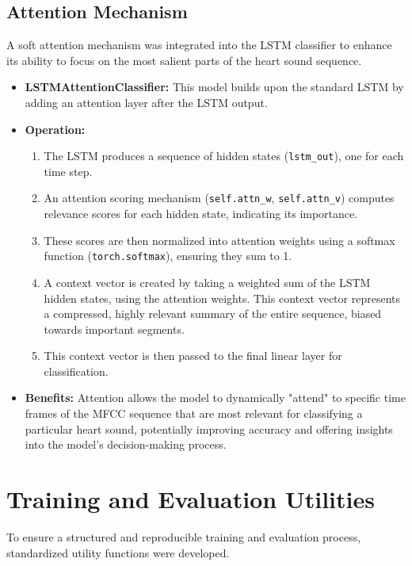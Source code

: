 \documentclass[a4paper]{article}
\begin{document}
\begin{multicols}{2}
\subsection{Attention Mechanism}
A soft attention mechanism was integrated into the LSTM classifier to enhance its ability to focus on the most salient parts of the heart sound sequence.
\begin{itemize}
    \item \textbf{LSTMAttentionClassifier:} This model builds upon the standard LSTM by adding an attention layer after the LSTM output.
    \item \textbf{Operation:}
        \begin{enumerate}
            \item The LSTM produces a sequence of hidden states (\texttt{lstm\_out}), one for each time step.
            \item An attention scoring mechanism (\texttt{self.attn\_w}, \texttt{self.attn\_v}) computes relevance scores for each hidden state, indicating its importance.
            \item These scores are then normalized into attention weights using a softmax function (\texttt{torch.softmax}), ensuring they sum to 1.
            \item A context vector is created by taking a weighted sum of the LSTM hidden states, using the attention weights. This context vector represents a compressed, highly relevant summary of the entire sequence, biased towards important segments.
            \item This context vector is then passed to the final linear layer for classification.
        \end{enumerate}
    \item \textbf{Benefits:} Attention allows the model to dynamically "attend" to specific time frames of the MFCC sequence that are most relevant for classifying a particular heart sound, potentially improving accuracy and offering insights into the model's decision-making process.

\end{itemize}

\section{Training and Evaluation Utilities}
To ensure a structured and reproducible training and evaluation process, standardized utility functions were developed.


\end{multicols}
\end{document}
